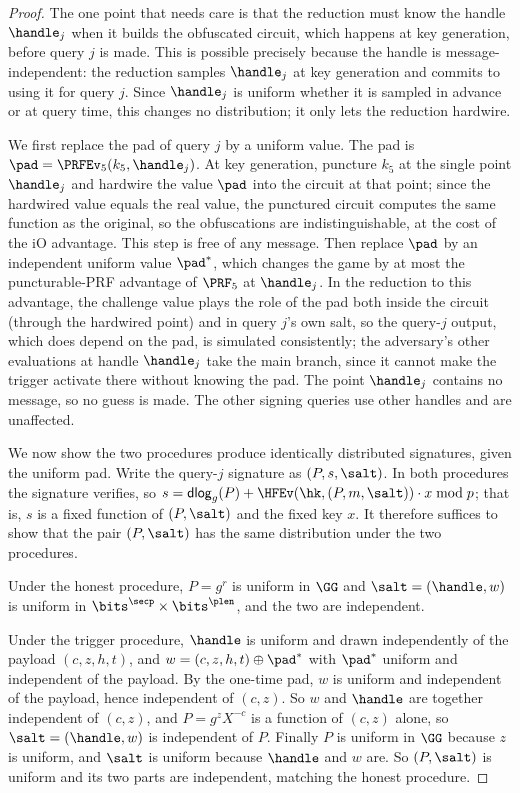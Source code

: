 \begin{proof}
The one point that needs care is that the reduction must know the handle $\handle_j$ when it builds the obfuscated circuit, which happens at key generation, before query $j$ is made. This is possible precisely because the handle is message-independent: the reduction samples $\handle_j$ at key generation and commits to using it for query $j$. Since $\handle_j$ is uniform whether it is sampled in advance or at query time, this changes no distribution; it only lets the reduction hardwire.

We first replace the pad of query $j$ by a uniform value. The pad is $\pad = \PRFEv_5(k_5, \handle_j)$. At key generation, puncture $k_5$ at the single point $\handle_j$ and hardwire the value $\pad$ into the circuit at that point; since the hardwired value equals the real value, the punctured circuit computes the same function as the original, so the obfuscations are indistinguishable, at the cost of the iO advantage. This step is free of any message. Then replace $\pad$ by an independent uniform value $\pad^\ast$, which changes the game by at most the puncturable-PRF advantage of $\PRF_5$ at $\handle_j$. In the reduction to this advantage, the challenge value plays the role of the pad both inside the circuit (through the hardwired point) and in query $j$'s own salt, so the query-$j$ output, which does depend on the pad, is simulated consistently; the adversary's other evaluations at handle $\handle_j$ take the main branch, since it cannot make the trigger activate there without knowing the pad. The point $\handle_j$ contains no message, so no guess is made. The other signing queries use other handles and are unaffected.

We now show the two procedures produce identically distributed signatures, given the uniform pad. Write the query-$j$ signature as $(P, s, \salt)$. In both procedures the signature verifies, so $s = \mathsf{dlog}_g(P) + \HFEv(\hk, (P, m, \salt)) \cdot x \bmod p$; that is, $s$ is a fixed function of $(P, \salt)$ and the fixed key $x$. It therefore suffices to show that the pair $(P, \salt)$ has the same distribution under the two procedures.

Under the honest procedure, $P = g^r$ is uniform in $\GG$ and $\salt = (\handle, w)$ is uniform in $\bits^{\secp} \times \bits^{\plen}$, and the two are independent.

Under the trigger procedure, $\handle$ is uniform and drawn independently of the payload $(c,z,h,t)$, and $w = (c, z, h, t) \oplus \pad^\ast$ with $\pad^\ast$ uniform and independent of the payload. By the one-time pad, $w$ is uniform and independent of the payload, hence independent of $(c, z)$. So $w$ and $\handle$ are together independent of $(c,z)$, and $P = g^{z} X^{-c}$ is a function of $(c,z)$ alone, so $\salt = (\handle, w)$ is independent of $P$. Finally $P$ is uniform in $\GG$ because $z$ is uniform, and $\salt$ is uniform because $\handle$ and $w$ are. So $(P,\salt)$ is uniform and its two parts are independent, matching the honest procedure.


\end{proof}
